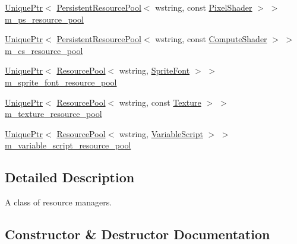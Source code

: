 \begin{DoxyCompactItemize}
\item 
\hyperlink{namespacemage_a3316d7143a973e37adf1110f2e80ca31}{Unique\+Ptr}$<$ \hyperlink{classmage_1_1_persistent_resource_pool}{Persistent\+Resource\+Pool}$<$ wstring, const \hyperlink{namespacemage_ac98506b7edd999ea43ec46fbd0330238}{Pixel\+Shader} $>$ $>$ \hyperlink{classmage_1_1_resource_manager_ab271d7c35552e28b3b79cb10fea5cf72}{m\+\_\+ps\+\_\+resource\+\_\+pool}
\item 
\hyperlink{namespacemage_a3316d7143a973e37adf1110f2e80ca31}{Unique\+Ptr}$<$ \hyperlink{classmage_1_1_persistent_resource_pool}{Persistent\+Resource\+Pool}$<$ wstring, const \hyperlink{namespacemage_af219172e81f21ea8002b17b1efbb25e0}{Compute\+Shader} $>$ $>$ \hyperlink{classmage_1_1_resource_manager_a5c363073fa94f73193faaa1f65365299}{m\+\_\+cs\+\_\+resource\+\_\+pool}
\item 
\hyperlink{namespacemage_a3316d7143a973e37adf1110f2e80ca31}{Unique\+Ptr}$<$ \hyperlink{classmage_1_1_resource_pool}{Resource\+Pool}$<$ wstring, \hyperlink{classmage_1_1_sprite_font}{Sprite\+Font} $>$ $>$ \hyperlink{classmage_1_1_resource_manager_a49369b160a75dee96cdebd2b957ae0c4}{m\+\_\+sprite\+\_\+font\+\_\+resource\+\_\+pool}
\item 
\hyperlink{namespacemage_a3316d7143a973e37adf1110f2e80ca31}{Unique\+Ptr}$<$ \hyperlink{classmage_1_1_resource_pool}{Resource\+Pool}$<$ wstring, const \hyperlink{classmage_1_1_texture}{Texture} $>$ $>$ \hyperlink{classmage_1_1_resource_manager_a267774ad90f546e73a9415e6baa37d2a}{m\+\_\+texture\+\_\+resource\+\_\+pool}
\item 
\hyperlink{namespacemage_a3316d7143a973e37adf1110f2e80ca31}{Unique\+Ptr}$<$ \hyperlink{classmage_1_1_resource_pool}{Resource\+Pool}$<$ wstring, \hyperlink{classmage_1_1_variable_script}{Variable\+Script} $>$ $>$ \hyperlink{classmage_1_1_resource_manager_adc36ebb3e2d04fddc3a23e2f1303dbfe}{m\+\_\+variable\+\_\+script\+\_\+resource\+\_\+pool}
\end{DoxyCompactItemize}


\subsection{Detailed Description}
A class of resource managers. 

\subsection{Constructor \& Destructor Documentation}
\hypertarget{classmage_1_1_resource_manager_a0ff509899a9fbef2096c60b3d3d80bd5}{}\label{classmage_1_1_resource_manager_a0ff509899a9fbef2096c60b3d3d80bd5} 
